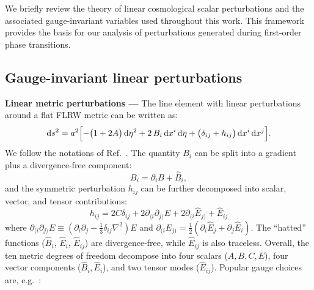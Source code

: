 \documentclass[twocolumn,superscriptaddress,aps,preprintnumbers,amsmath,amssymb,prl,footinbib]{revtex4-2}
\begin{document}
We briefly review the theory of linear cosmological scalar perturbations and the associated gauge-invariant variables used throughout this work.
This framework provides the basis for our analysis of perturbations generated during first-order phase transitions.

\subsection{Gauge-invariant linear perturbations}

\textbf{Linear metric perturbations ---}
The line element with linear perturbations around a flat FLRW metric can be written as:
\begin{equation}
    \mathrm{d}s^2
    =
    a^2 \Bigl[
    -\bigl(1 + 2A\bigr)\,\mathrm{d}\eta^2
    + 2\,B_i\,\mathrm{d}x^i\,\mathrm{d}\eta
    + \bigl(\delta_{ij} + h_{ij}\bigr)\,\mathrm{d}x^i\,\mathrm{d}x^j
    \Bigr].
\end{equation}
We follow the notations of Ref.~\cite{Peter:2013avv,Baumann:2022mni}.
The quantity $B_i$ can be split into a gradient plus a divergence-free component:
\begin{equation}
    B_i = \partial_i B + \hat{B}_i,
\end{equation}
and the symmetric perturbation $h_{ij}$ can be further decomposed into scalar, vector, and tensor contributions:
\begin{equation}
    h_{ij} = 2C\delta_{ij}
    + 2\partial_{\langle i}\partial_{j\rangle}E
    + 2\partial_{(i}\hat{E}_{j)}
    + \hat{E}_{ij}
\end{equation}
where $\partial_{\langle i}\partial_{j\rangle} E \equiv (\partial_i\partial_j - \tfrac{1}{3}\delta_{ij}\nabla^2)E$ and $\partial_{(i} \hat{E}_{j)}
= \frac{1}{2} \left( \partial_i \hat{E}_j + \partial_j \hat{E}_i \right)$. The “hatted” functions ($\hat{B}_i$, $\hat{E}_i$, $\hat{E}_{ij}$) are divergence-free, while $\hat{E}_{ij}$ is also traceless. Overall, the ten metric degrees of freedom decompose into four scalars ($A,B,C,E$), four vector components ($\hat{B}_i, \hat{E}_i$), and two tensor modes ($\hat{E}_{ij}$).
Popular gauge choices are, e.g.~\cite{Kodama:1984ziu}:
\end{document}
